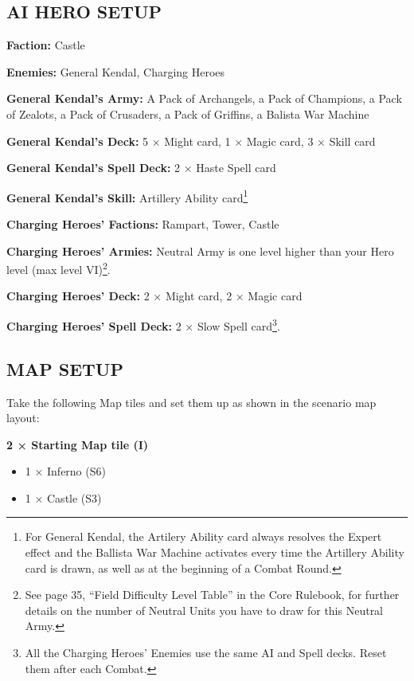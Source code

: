 \begin{multicols*}{2}
\subsection*{\MakeUppercase{AI hero setup}}

\textbf{Faction:} Castle

\textbf{Enemies:} General Kendal, Charging Heroes

\textbf{General Kendal's Army:} A Pack of Archangels, a Pack of Champions, a Pack of Zealots, a Pack of Crusaders, a Pack of Griffins, a Balista War Machine

\textbf{General Kendal's Deck:} 5 × Might card, 1 × Magic card, 3 × Skill card

\textbf{General Kendal's Spell Deck:} 2 × Haste Spell card

\textbf{General Kendal's Skill:} Artillery Ability card\footnote{For General Kendal, the Artilery Ability card always resolves the Expert effect and the Ballista War Machine activates every time the Artillery Ability card is drawn, as well as at the beginning of a Combat Round.}

\textbf{Charging Heroes' Factions:} Rampart, Tower, Castle

\textbf{Charging Heroes' Armies:} Neutral Army is one level higher than your Hero level (max level VI)\footnote{See page 35, ``Field Difficulty Level Table'' in the Core Rulebook, for further details on the number of Neutral Units you have to draw for this Neutral Army.}.

\textbf{Charging Heroes' Deck:} 2 × Might card, 2 × Magic card

\textbf{Charging Heroes' Spell Deck:} 2 × Slow Spell card\footnote{All the Charging Heroes' Enemies use the same AI and Spell decks. Reset them after each Combat.}.

\subsection*{\MakeUppercase{Map setup}}

Take the following Map tiles and set them up as shown in the scenario map layout:

\textbf{2 × Starting Map tile (I)}
\begin{itemize}
  \item 1 × Inferno (S6)
  \item 1 × Castle (S3)
\end{itemize}

\vspace*{\fill}\columnbreak


\end{multicols*}
